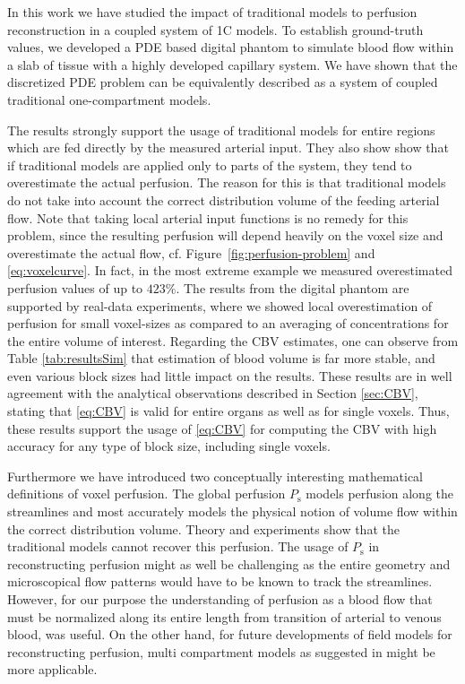\documentclass[journal,twocolumn]{IEEEtran}
\newcommand{\Perfs}{P_{\mathrm{s}}}
\begin{document}
	In this work we have studied the impact of traditional models to perfusion reconstruction in a coupled system of 1C models.
	To establish ground-truth values, we developed a PDE based digital phantom to simulate blood flow within a slab of tissue with a highly developed capillary system.
	We have shown that the discretized PDE problem can be equivalently described as a system of coupled traditional one-compartment models.
	
	
	
	
	The results strongly support the usage of traditional models for entire regions which are fed directly by the measured arterial input.
	They also show show that if traditional models are applied only to parts of the system, they tend to overestimate the actual perfusion. The reason for this is that traditional models do not take into account the correct distribution volume of the feeding arterial flow.
	Note that taking local arterial input functions is no remedy for this problem, since the resulting perfusion will depend heavily on the voxel size and overestimate the actual flow, cf. Figure~\ref{fig:perfusion-problem} and \eqref{eq:voxelcurve}.
	In fact, in the most extreme example we measured overestimated perfusion values of up to $423\%$.
	The results from the digital phantom are supported by real-data experiments, where we showed local overestimation of perfusion for small voxel-sizes as compared to an averaging of concentrations for the entire volume of interest.
	Regarding the CBV estimates, one can observe from Table \ref{tab:resultsSim} that estimation of blood volume is far more stable, and  
	even various block sizes had little impact on the results. 
	These results are in well agreement with the analytical observations described in Section \ref{sec:CBV}, stating that \eqref{eq:CBV} is valid for entire organs as well as for single voxels. 
	Thus, these results support the usage of \eqref{eq:CBV} for computing the CBV with high accuracy for any type of block size, including single voxels.



	Furthermore we have introduced two conceptually interesting mathematical definitions of voxel perfusion.
	The global perfusion $\Perfs$ models perfusion along the streamlines and most accurately models the physical notion of volume flow within the correct distribution volume.
	Theory and experiments show that the traditional models cannot recover this perfusion. The usage of $\Perfs$ in reconstructing perfusion might as well be challenging as the entire geometry and microscopical flow patterns would have to be known to track the streamlines. However, for our purpose the understanding of perfusion as a blood flow that must be normalized along its entire length from transition of arterial to venous blood, was useful. On the other hand, for future developments of field models for reconstructing perfusion, multi compartment models as suggested in \cite{sourbron14} might be more applicable.
	
\end{document}
